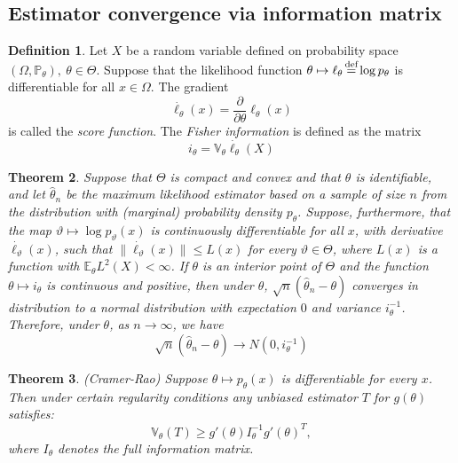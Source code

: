 \documentclass[12pt]{article}
\newtheorem{theorem}{Theorem}[section]
\theoremstyle{definition}
\newtheorem{definition}[theorem]{Definition}
\theoremstyle{remark}
\numberwithin{equation}{section}
\newcommand{\PP}{\mathbb{P}}
\newcommand{\EE}{\mathbb{E}}
\newcommand{\VV}{\mathbb{V}}
\newcommand{\eq}{\stackrel{\mathclap{\normalfont\text{def}}}{=}}
\begin{document}
\subsection{Estimator convergence via information matrix}

\begin{definition}\label{information_def}
Let $X$ be a random variable defined on probability space $(\Omega,\PP_\theta),\ \theta\in\Theta$. Suppose that the likelihood function $\theta\mapsto\ell_\theta \eq \log p_\theta$ is differentiable for all $x\in\Omega$. The gradient
\begin{equation*}
	\dot{\ell_\theta}(x) = \frac{\partial}{\partial\theta}\ell_\theta(x)
\end{equation*}
is called the \emph{score function}. The \emph{Fisher information} is defined as the matrix
\begin{equation*}
	i_\theta = \VV_\theta\dot{\ell_\theta}(X)
\end{equation*}
\end{definition}

\begin{theorem}
	Suppose that $\Theta$ is compact and convex and that $\theta$ is identifiable, and let $\hat{\theta}_n$ be the maximum likelihood estimator based on a sample of size $n$ from the distribution with (marginal) probability density $p_\theta$. Suppose, furthermore, that the map $\vartheta\mapsto \log p_\vartheta(x)$ is continuously differentiable for all $x$, with derivative $\dot{\ell_\vartheta}(x)$, such that $\|\dot{\ell_\vartheta}(x)\|\leq L(x)$ for every $\vartheta\in\Theta$, where $L(x)$ is a function with $\EE_\theta L^2(X)<\infty$.
	If $\theta$ is an interior point of $\Theta$ and the function $\theta\mapsto i_\theta$ is continuous and positive, then under $\theta$, $\sqrt{n}(\hat{\theta}_n - \theta)$
	converges in distribution to a normal distribution with expectation $0$ and variance $i^{-1}_\theta$. Therefore, under $\theta$, as $n\rightarrow\infty$, we have
	\begin{equation*}
		\sqrt{n}(\hat{\theta}_n - \theta) \rightarrow N(0, i_\theta^{-1})
	\end{equation*}
\end{theorem}

\begin{theorem}\label{cramerraobound}\emph{(Cramer-Rao)}
	Suppose $\theta\mapsto p_\theta(x)$ is differentiable for every $x$. Then under certain regularity conditions any unbiased estimator $T$ for $g(\theta)$ satisfies:
	\begin{equation*}
		\VV_\theta(T) \geq g'(\theta)I_\theta^{-1}g'(\theta)^T,
	\end{equation*}
	where $I_\theta$ denotes the \emph{full} information matrix.
\end{theorem}
\end{document}
